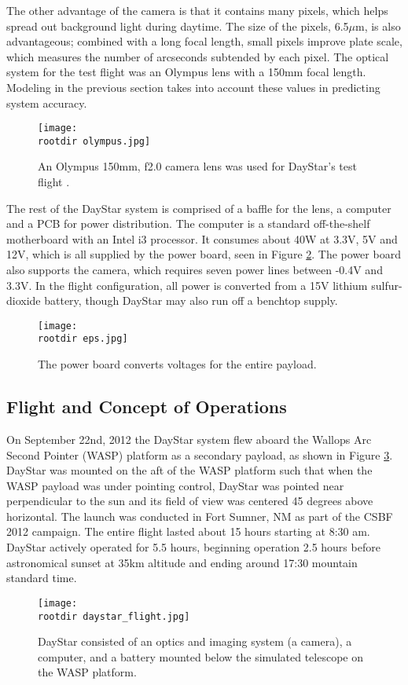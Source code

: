 \documentclass[twocolumn,letterpaper]{IEEEAerospace2012}
\newcommand{\rootdir}{./Figures/}
\begin{document}
The other advantage of the camera is that it contains many pixels, which helps spread out background light during daytime. The size of the pixels, 6.5$\mu$m, is also advantageous; combined with a long focal length, small pixels improve plate scale, which measures the number of arcseconds subtended by each pixel. The optical system for the test flight was an Olympus lens with a 150mm focal length. Modeling in the previous section takes into account these values in predicting system accuracy.
\begin{figure}[H]
    \centering
    \texttt{[image: \\rootdir olympus.jpg]}
    \caption{An Olympus 150mm, f2.0 camera lens was used for DayStar's test flight \protect\cite{olympus}.}
    \label{fig:olympus}
\end{figure}
The rest of the DayStar system is comprised of a baffle for the lens, a computer and a PCB for power distribution. The computer is a standard off-the-shelf motherboard with an Intel i3 processor. It consumes about 40W at 3.3V, 5V and 12V, which is all supplied by the power board, seen in Figure \ref{fig:power}. The power board also supports the camera, which requires seven power lines between -0.4V and 3.3V. In the flight configuration, all power is converted from a 15V lithium sulfur-dioxide battery, though DayStar may also run off a benchtop supply.
\begin{figure}[H]
    \texttt{[image: \\rootdir eps.jpg]}
    \caption{The power board converts voltages for the entire payload.}
    \label{fig:power}
\end{figure}

\subsection{Flight and Concept of Operations}
On September 22nd, 2012 the DayStar system flew aboard the Wallops Arc Second Pointer (WASP) platform as a secondary payload, as shown in Figure \ref{fig:flight}. DayStar was mounted on the aft of the WASP platform such that when the WASP payload was under pointing control, DayStar was pointed near perpendicular to the sun and its field of view was centered 45 degrees above horizontal. The launch was conducted in Fort Sumner, NM as part of the CSBF 2012 campaign. The entire flight lasted about 15 hours starting at 8:30 am. DayStar actively operated for 5.5 hours, beginning operation 2.5 hours before astronomical sunset at 35km altitude and ending around 17:30 mountain standard time.
\begin{figure}
    \centering
    \texttt{[image: \\rootdir daystar\_flight.jpg]}
    \caption{DayStar consisted of an optics and imaging system (a camera), a computer, and a battery mounted below the simulated telescope on the WASP platform.}
    \label{fig:flight}
\end{figure}
\end{document}
